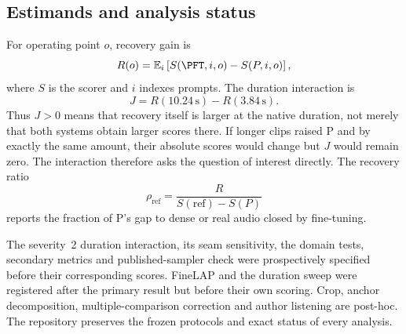 \subsection{Estimands and analysis status}
For operating point $o$, recovery gain is
\begin{equation}
R(o)=\mathbb{E}_{i}\left[S(\PFT,i,o)-S(P,i,o)\right],
\end{equation}
where $S$ is the scorer and $i$ indexes prompts. The duration interaction is
\begin{equation}
J=R(10.24\,\mathrm{s})-R(3.84\,\mathrm{s}).
\end{equation}
Thus $J>0$ means that recovery itself is larger at the native duration, not merely that both systems obtain larger scores there. If longer clips raised P and \PFT{} by exactly the same amount, their absolute scores would change but $J$ would remain zero. The interaction therefore asks the question of interest directly. The recovery ratio
\begin{equation}
\rho_{\mathrm{ref}}=\frac{R}{S(\mathrm{ref})-S(P)}
\end{equation}
reports the fraction of P's gap to dense or real audio closed by fine-tuning.

The severity~2 duration interaction, its seam sensitivity, the domain tests, secondary metrics and published-sampler check were prospectively specified before their corresponding scores. FineLAP and the duration sweep were registered after the primary result but before their own scoring. Crop, anchor decomposition, multiple-comparison correction and author listening are post-hoc. The repository preserves the frozen protocols and exact status of every analysis.

